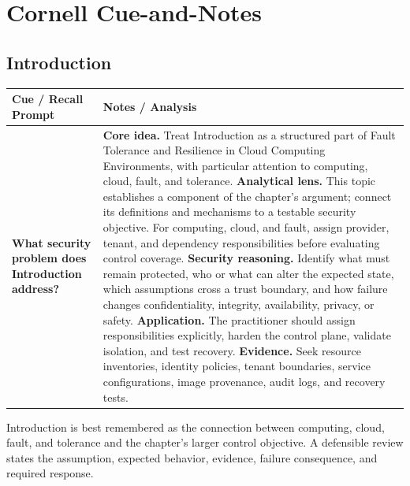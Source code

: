 \documentclass[11pt]{article}
\newcommand{\CornellHeader}{%
\rowcolor{Navy}\color{white}\bfseries Cue / Recall Prompt & \color{white}\bfseries Notes / Analysis\\\hline}
\newcommand{\CornellRow}[2]{%
\cellcolor{CueGray}\RaggedRight\textbf{#1} & \RaggedRight #2\\\hline}
\begin{document}
\section*{Cornell Cue-and-Notes}
\subsection*{Introduction}
\begin{longtable}{>{\RaggedRight\arraybackslash}p{}|>{\RaggedRight\arraybackslash}p{}}
\CornellHeader
\CornellRow{What security problem does Introduction address?}{\textbf{Core idea.} Treat Introduction as a structured part of Fault Tolerance and Resilience in Cloud Computing Environments, with particular attention to computing, cloud, fault, and tolerance. \textbf{Analytical lens.} This topic establishes a component of the chapter's argument; connect its definitions and mechanisms to a testable security objective. For computing, cloud, and fault, assign provider, tenant, and dependency responsibilities before evaluating control coverage. \textbf{Security reasoning.} Identify what must remain protected, who or what can alter the expected state, which assumptions cross a trust boundary, and how failure changes confidentiality, integrity, availability, privacy, or safety. \textbf{Application.} The practitioner should assign responsibilities explicitly, harden the control plane, validate isolation, and test recovery. \textbf{Evidence.} Seek resource inventories, identity policies, tenant boundaries, service configurations, image provenance, audit logs, and recovery tests.}
\end{longtable}
\begin{topicsummary}
Introduction is best remembered as the connection between computing, cloud, fault, and tolerance and the chapter's larger control objective. A defensible review states the assumption, expected behavior, evidence, failure consequence, and required response.
\end{topicsummary}
\end{document}

